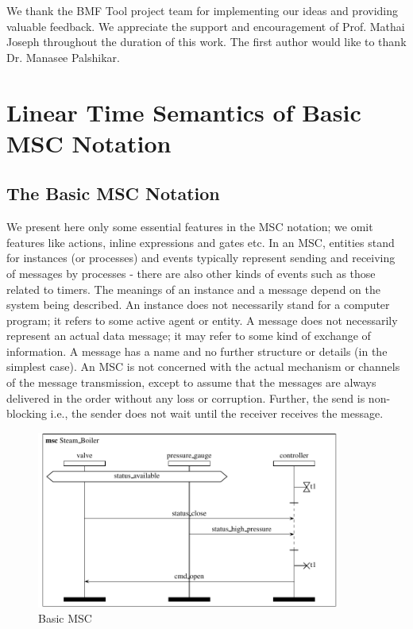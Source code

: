 \documentclass{entcs}
\begin{document}
\begin{ack}
We thank the BMF Tool project team for implementing our ideas and providing valuable feedback.
We appreciate the support and encouragement of Prof. Mathai Joseph throughout the duration of
this work. The first author would like to thank Dr. Manasee Palshikar.
\end{ack}

\appendix
\section{Linear Time Semantics of Basic MSC Notation}\label{app}

\subsection{The Basic MSC Notation}

We present here only some essential features in the MSC 
notation; we omit features like actions, inline expressions 
and gates etc. In an MSC, entities stand for instances 
(or processes) and events typically represent sending 
and receiving of messages by processes - there are also 
other kinds of events such as those related to timers. 
The meanings of an instance and a message depend on 
the system being described. An instance does not 
necessarily stand for a computer program; it refers to 
some active agent or entity. A message does not 
necessarily represent an actual data message; it may 
refer to some kind of exchange of information. A message 
has a name and no further structure or details (in the 
simplest case). An MSC is not concerned with the 
actual mechanism or channels of the message transmission, 
except to assume that the messages are always delivered 
in the order without any loss or corruption. Further, 
the send is non-blocking i.e., the sender does not wait 
until the receiver receives the message.

\begin{figure}[t]
\centering
\includegraphics[width=10cm]{fig2}
\caption{Basic MSC}
\label{fig2}
\end{figure}
\end{document}
